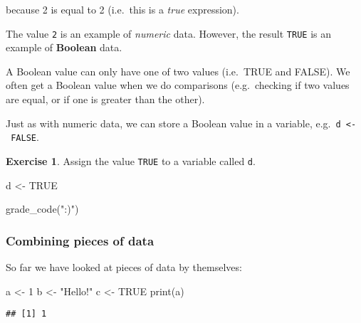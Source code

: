 \documentclass[
]{article}
\newenvironment{Shaded}{\begin{snugshade}}{\end{snugshade}}
\newcommand{\ConstantTok}[1]{\textcolor[rgb]{0.00,0.00,0.00}{#1}}
\newcommand{\DecValTok}[1]{\textcolor[rgb]{0.00,0.00,0.81}{#1}}
\newcommand{\FunctionTok}[1]{\textcolor[rgb]{0.00,0.00,0.00}{#1}}
\newcommand{\NormalTok}[1]{#1}
\newcommand{\OtherTok}[1]{\textcolor[rgb]{0.56,0.35,0.01}{#1}}
\newcommand{\StringTok}[1]{\textcolor[rgb]{0.31,0.60,0.02}{#1}}
\theoremstyle{definition}
\theoremstyle{definition}
\theoremstyle{definition}
\newtheorem{exercise}{Exercise}[section]
\theoremstyle{definition}
\theoremstyle{remark}
\begin{document}
because 2 is equal to 2 (i.e.~this is a \emph{true} expression).

The value \texttt{2} is an example of \emph{numeric} data. However, the result \texttt{TRUE} is an example of \textbf{Boolean} data.

A Boolean value can only have one of two values (i.e.~TRUE and FALSE). We often get a Boolean value when we do comparisons (e.g.~checking if two values are equal, or if one is greater than the other).

Just as with numeric data, we can store a Boolean value in a variable, e.g.~\texttt{d\ \textless{}-\ FALSE}.

\begin{exercise}
Assign the value \texttt{TRUE} to a variable called \texttt{d}.
\end{exercise}

\begin{Shaded}
\begin{Highlighting}[]
\NormalTok{ d }\OtherTok{\textless{}{-}} \ConstantTok{TRUE}
\end{Highlighting}
\end{Shaded}

\begin{Shaded}
\begin{Highlighting}[]
\FunctionTok{grade\_code}\NormalTok{(}\StringTok{":)"}\NormalTok{)}
\end{Highlighting}
\end{Shaded}

\hypertarget{combining-pieces-of-data}{%
\subsubsection{Combining pieces of data}\label{combining-pieces-of-data}}

So far we have looked at pieces of data by themselves:

\begin{Shaded}
\begin{Highlighting}[]
\NormalTok{a }\OtherTok{\textless{}{-}} \DecValTok{1}
\NormalTok{b }\OtherTok{\textless{}{-}} \StringTok{"Hello!"}
\NormalTok{c }\OtherTok{\textless{}{-}} \ConstantTok{TRUE}
\FunctionTok{print}\NormalTok{(a)}
\end{Highlighting}
\end{Shaded}

\begin{verbatim}
## [1] 1
\end{verbatim}
\end{document}
